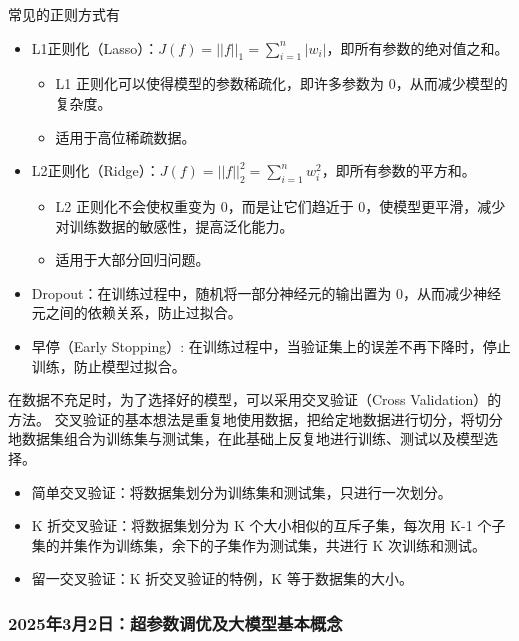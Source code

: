 \documentclass[12pt]{article}
\begin{document}
常见的正则方式有
\begin{itemize}
    \item L1正则化（Lasso）：$J(f) = ||f||_1 = \sum_{i=1}^{n} |w_i|$，即所有参数的绝对值之和。
          \begin{itemize}
              \item L1 正则化可以使得模型的参数稀疏化，即许多参数为 0，从而减少模型的复杂度。
              \item 适用于高位稀疏数据。
          \end{itemize}
    \item L2正则化（Ridge）：$J(f) = ||f||_2^2 = \sum_{i=1}^{n} w_i^2$，即所有参数的平方和。
          \begin{itemize}
              \item L2 正则化不会使权重变为 0，而是让它们趋近于 0，使模型更平滑，减少对训练数据的敏感性，提高泛化能力。
              \item 适用于大部分回归问题。
          \end{itemize}
    \item Dropout：在训练过程中，随机将一部分神经元的输出置为 0，从而减少神经元之间的依赖关系，防止过拟合。
    \item 早停（Early Stopping）: 在训练过程中，当验证集上的误差不再下降时，停止训练，防止模型过拟合。
\end{itemize}
在数据不充足时，为了选择好的模型，可以采用交叉验证（Cross Validation）的方法。
交叉验证的基本想法是重复地使用数据，把给定地数据进行切分，将切分地数据集组合为训练集与测试集，在此基础上反复地进行训练、测试以及模型选择。
\begin{itemize}
    \item 简单交叉验证：将数据集划分为训练集和测试集，只进行一次划分。
    \item K 折交叉验证：将数据集划分为 K 个大小相似的互斥子集，每次用 K-1 个子集的并集作为训练集，余下的子集作为测试集，共进行 K 次训练和测试。
    \item 留一交叉验证：K 折交叉验证的特例，K 等于数据集的大小。
\end{itemize}

\subsubsection{2025年3月2日：超参数调优及大模型基本概念}
\noindent{}
\end{document}
